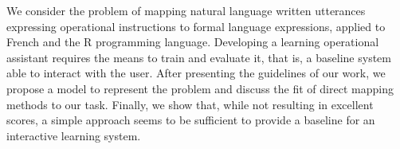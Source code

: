 We consider the problem of mapping natural language written utterances expressing operational instructions to formal language expressions, applied to French and the R programming language. Developing a learning operational assistant requires the means to train and evaluate it, that is, a baseline system able to interact with the user. After presenting the guidelines of our work, we propose a model to represent the problem and discuss the fit of direct mapping methods to our task. Finally, we show that, while not resulting in excellent scores, a simple approach seems to be sufficient to provide a baseline for an interactive learning system.
